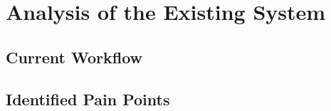 \section{Analysis of the Existing System}

\lipsum[1]

\subsection{Current Workflow}

\lipsum[2]

\subsection{Identified Pain Points}

\lipsum[3]
